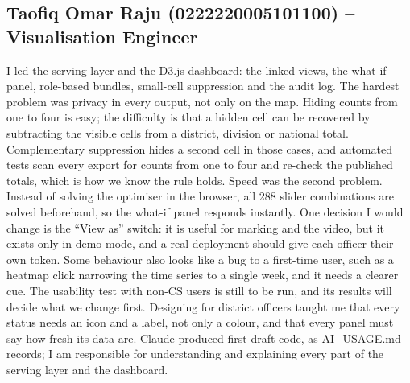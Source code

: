 \subsection*{Taofiq Omar Raju (0222220005101100) -- Visualisation Engineer}
I led the serving layer and the D3.js dashboard: the linked views, the what-if panel, role-based bundles, small-cell
suppression and the audit log. The hardest problem was privacy in every output, not only on the map. Hiding counts
from one to four is easy; the difficulty is that a hidden cell can be recovered by subtracting the visible cells from
a district, division or national total. Complementary suppression hides a second cell in those cases, and automated
tests scan every export for counts from one to four and re-check the published totals, which is how we know the rule
holds. Speed was the second problem. Instead of solving the optimiser in the browser, all 288 slider combinations are
solved beforehand, so the what-if panel responds instantly. One decision I would change is the ``View as'' switch:
it is useful for marking and the video, but it exists only in demo mode, and a real deployment should give each
officer their own token. Some behaviour also looks like a bug to a first-time user, such as a heatmap click narrowing
the time series to a single week, and it needs a clearer cue. The usability test with non-CS users is still to be
run, and its results will decide what we change first. Designing for district officers taught me that every status
needs an icon and a label, not only a colour, and that every panel must say how fresh its data are. Claude produced
first-draft code, as AI\_USAGE.md records; I am responsible for understanding and explaining every part of the serving
layer and the dashboard.
